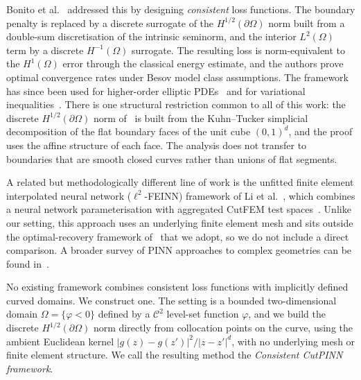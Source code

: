 \documentclass[11pt]{article}
\newcommand{\Omg}{\Omega}
\newcommand{\bOmg}{\partial\Omega}
\newcommand{\C}{\mathcal{C}}
\newcommand{\Honehalf}{H^{1/2}(\partial\Omega)}
\begin{document}
Bonito et al.~\cite{bonito2025} addressed this by designing
\emph{consistent} loss functions. The boundary penalty is replaced
by a discrete surrogate of the $H^{1/2}(\bOmg)$ norm built from a
double-sum discretisation of the intrinsic seminorm, and the
interior $L^2(\Omg)$
term by a discrete $H^{-1}(\Omg)$ surrogate. The resulting loss is
norm-equivalent to the $H^1(\Omg)$ error through the classical
energy estimate, and the authors prove optimal convergence rates
under Besov model class assumptions. The framework has since been
used for higher-order elliptic PDEs~\cite{mishra2026consistent} and
for variational inequalities~\cite{khan2026mixed}. There is one
structural restriction common to all of this work: the discrete
$H^{1/2}(\bOmg)$ norm of~\cite{bonito2025} is built from the
Kuhn--Tucker simplicial decomposition of the flat boundary faces of
the unit cube $(0,1)^d$, and the proof uses the affine structure of
each face. The analysis does not transfer to boundaries that are
smooth closed curves rather than unions of flat segments.

A related but methodologically different line of work is the
unfitted finite element interpolated neural network
($\ell^2$-FEINN) framework of Li et al.~\cite{li2026}, which
combines a neural network parameterisation with aggregated CutFEM
test spaces~\cite{badia2018aggregated}. Unlike our setting, this
approach uses an underlying finite element mesh and sits outside
the optimal-recovery framework of~\cite{bonito2025} that we adopt,
so we do not include a direct comparison. A broader survey of
PINN approaches to complex geometries can be found
in~\cite{plankovskyy2025review}.

No existing framework combines consistent loss functions with
implicitly defined curved domains. We construct one. The setting
is a bounded two-dimensional domain $\Omg = \{\varphi < 0\}$
defined by a $\C^2$ level-set function $\varphi$, and we build the
discrete $\Honehalf$ norm directly from collocation points on the
curve, using the ambient Euclidean kernel
$|g(z)-g(z')|^2/|z-z'|^d$, with no underlying mesh or finite
element structure. We call the resulting method the
\emph{Consistent CutPINN framework}.
\end{document}
